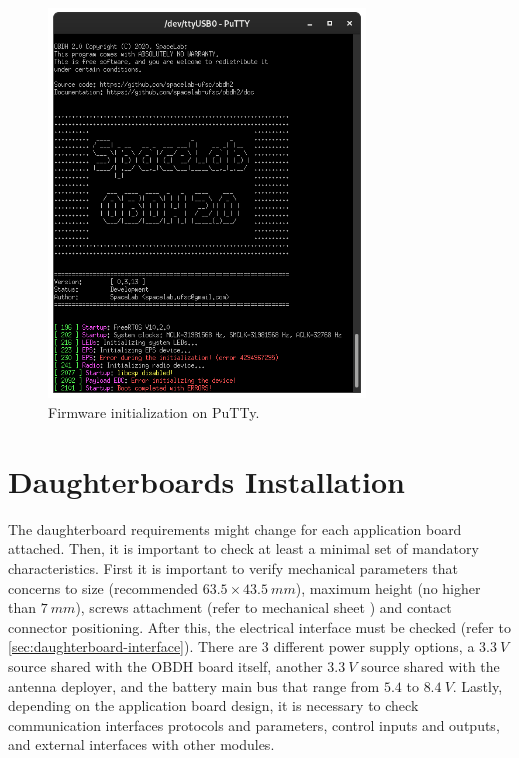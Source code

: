 \begin{figure}[!ht]
    \begin{center}
        \includegraphics[width=0.75\textwidth]{figures/putty-output.png}
        \caption{Firmware initialization on PuTTy.}
        \label{fig:putty-output}
    \end{center}
\end{figure}

\section{Daughterboards Installation}

The daughterboard requirements might change for each application board attached. Then, it is important to check at least a minimal set of mandatory characteristics. First it is important to verify mechanical parameters that concerns to size (recommended $63.5 \times 43.5\ mm$), maximum height (no higher than $7\ mm$), screws attachment (refer to mechanical sheet \cite{obdh2-draftsman}) and contact connector positioning. After this, the electrical interface must be checked (refer to \autoref{sec:daughterboard-interface}). There are 3 different power supply options, a $3.3\ V$ source shared with the OBDH board itself, another $3.3\ V$ source shared with the antenna deployer, and the battery main bus that range from $5.4$ to $8.4\ V$. Lastly, depending on the application board design, it is necessary to check communication interfaces protocols and parameters, control inputs and outputs, and external interfaces with other modules.
